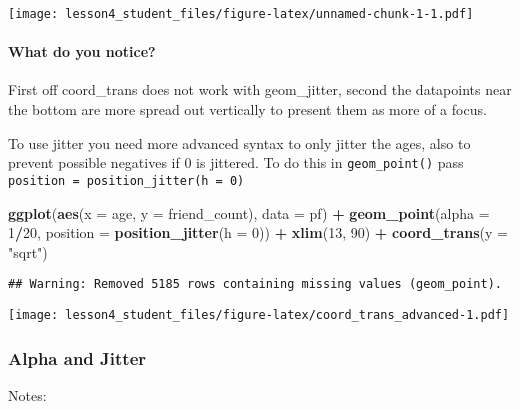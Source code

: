 \documentclass[]{article}
\newenvironment{Shaded}{\begin{snugshade}}{\end{snugshade}}
\newcommand{\KeywordTok}[1]{\textcolor[rgb]{0.13,0.29,0.53}{\textbf{#1}}}
\newcommand{\DataTypeTok}[1]{\textcolor[rgb]{0.13,0.29,0.53}{#1}}
\newcommand{\DecValTok}[1]{\textcolor[rgb]{0.00,0.00,0.81}{#1}}
\newcommand{\StringTok}[1]{\textcolor[rgb]{0.31,0.60,0.02}{#1}}
\newcommand{\OperatorTok}[1]{\textcolor[rgb]{0.81,0.36,0.00}{\textbf{#1}}}
\newcommand{\NormalTok}[1]{#1}
\let\oldparagraph\paragraph
\renewcommand{\paragraph}[1]{\oldparagraph{#1}\mbox{}}
\begin{document}
\texttt{[image: lesson4\_student\_files/figure-latex/unnamed-chunk-1-1.pdf]}

\paragraph{What do you notice?}\label{what-do-you-notice}

First off coord\_trans does not work with geom\_jitter, second the
datapoints near the bottom are more spread out vertically to present
them as more of a focus.

To use jitter you need more advanced syntax to only jitter the ages,
also to prevent possible negatives if 0 is jittered. To do this in
\texttt{geom\_point()} pass
\texttt{position\ =\ position\_jitter(h\ =\ 0)}

\begin{Shaded}
\begin{Highlighting}[]
\KeywordTok{ggplot}\NormalTok{(}\KeywordTok{aes}\NormalTok{(}\DataTypeTok{x =}\NormalTok{ age, }\DataTypeTok{y =}\NormalTok{ friend_count), }\DataTypeTok{data =}\NormalTok{ pf) }\OperatorTok{+}
\StringTok{  }\KeywordTok{geom_point}\NormalTok{(}\DataTypeTok{alpha =} \DecValTok{1}\OperatorTok{/}\DecValTok{20}\NormalTok{, }\DataTypeTok{position =} \KeywordTok{position_jitter}\NormalTok{(}\DataTypeTok{h =} \DecValTok{0}\NormalTok{)) }\OperatorTok{+}
\StringTok{  }\KeywordTok{xlim}\NormalTok{(}\DecValTok{13}\NormalTok{, }\DecValTok{90}\NormalTok{) }\OperatorTok{+}
\StringTok{  }\KeywordTok{coord_trans}\NormalTok{(}\DataTypeTok{y =} \StringTok{"sqrt"}\NormalTok{)}
\end{Highlighting}
\end{Shaded}

\begin{verbatim}
## Warning: Removed 5185 rows containing missing values (geom_point).
\end{verbatim}

\texttt{[image: lesson4\_student\_files/figure-latex/coord\_trans\_advanced-1.pdf]}

\subsubsection{Alpha and Jitter}\label{alpha-and-jitter}

Notes:
\end{document}
